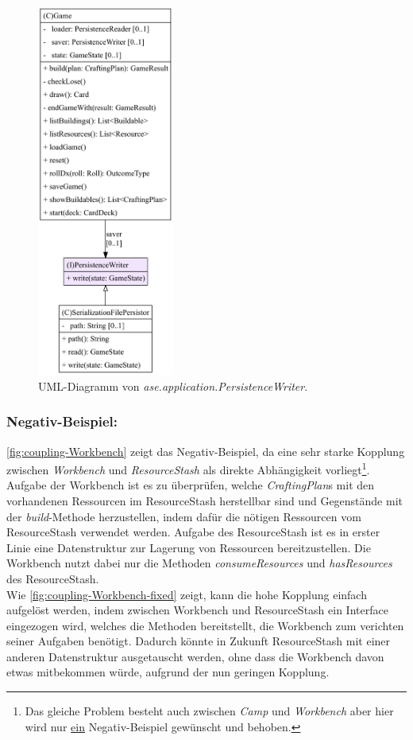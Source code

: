 \begin{figure}[H]
	\centering
	\includegraphics[width=0.4\textwidth]{Bilder/PersistenceWriter_structure.pdf} 
	\caption{UML-Diagramm von \textit{ase.application.PersistenceWriter}.}
	\label{fig:coupling-PersistenceWriter}
\end{figure} 

\subsubsection{Negativ-Beispiel:}

\autoref{fig:coupling-Workbench} zeigt das Negativ-Beispiel, da eine sehr starke Kopplung zwischen \textit{Workbench} 
und \textit{ResourceStash} als direkte Abhängigkeit vorliegt\footnote{Das gleiche Problem besteht auch 
zwischen \textit{Camp} und \textit{Workbench} aber hier wird nur \underline{ein} Negativ-Beispiel gewünscht und behoben.}. \\
Aufgabe der Workbench ist es zu überprüfen, welche \textit{CraftingPlan}s mit den vorhandenen Ressourcen im 
ResourceStash herstellbar sind und Gegenstände mit der \textit{build}-Methode herzustellen, indem dafür die 
nötigen Ressourcen vom ResourceStash verwendet werden. Aufgabe des ResourceStash ist es in erster Linie eine Datenstruktur
zur Lagerung von Ressourcen bereitzustellen. Die Workbench nutzt dabei nur die Methoden \textit{consumeResources} 
und \textit{hasResources} des ResourceStash. \\
Wie \autoref{fig:coupling-Workbench-fixed} zeigt, kann die hohe Kopplung einfach aufgelöst werden, 
indem zwischen Workbench und ResourceStash ein Interface eingezogen wird, welches die Methoden bereitstellt, 
die Workbench zum verichten seiner Aufgaben benötigt. Dadurch könnte in Zukunft ResourceStash mit einer anderen 
Datenstruktur ausgetauscht werden, ohne dass die Workbench davon etwas mitbekommen würde, aufgrund der nun geringen Kopplung.

